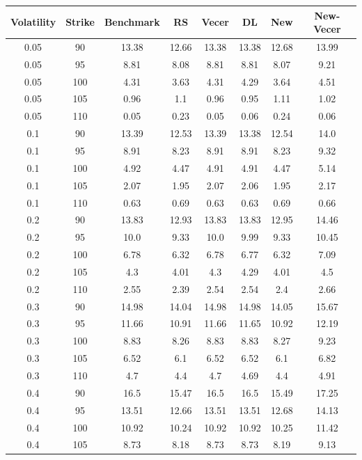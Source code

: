 \documentclass{article}
\begin{document}
\scriptsize
\begin{table}[H]
  \begin{tabular}{|c|c|c|c|c|c|c|c|}
  \hline
  Volatility & Strike & Benchmark & RS & Vecer & DL & New & New-Vecer \\
  \hline
  0.05 & 90 & 13.38 & 12.66 & 13.38 & 13.38 & 12.68 & 13.99 \\
  0.05 & 95 & 8.81 & 8.08 & 8.81 & 8.81 & 8.07 & 9.21 \\
  0.05 & 100 & 4.31 & 3.63 & 4.31 & 4.29 & 3.64 & 4.51 \\
  0.05 & 105 & 0.96 & 1.1 & 0.96 & 0.95 & 1.11 & 1.02 \\
  0.05 & 110 & 0.05 & 0.23 & 0.05 & 0.06 & 0.24 & 0.06 \\
  0.1 & 90 & 13.39 & 12.53 & 13.39 & 13.38 & 12.54 & 14.0 \\
  0.1 & 95 & 8.91 & 8.23 & 8.91 & 8.91 & 8.23 & 9.32 \\
  0.1 & 100 & 4.92 & 4.47 & 4.91 & 4.91 & 4.47 & 5.14 \\
  0.1 & 105 & 2.07 & 1.95 & 2.07 & 2.06 & 1.95 & 2.17 \\
  0.1 & 110 & 0.63 & 0.69 & 0.63 & 0.63 & 0.69 & 0.66 \\
  0.2 & 90 & 13.83 & 12.93 & 13.83 & 13.83 & 12.95 & 14.46 \\
  0.2 & 95 & 10.0 & 9.33 & 10.0 & 9.99 & 9.33 & 10.45 \\
  0.2 & 100 & 6.78 & 6.32 & 6.78 & 6.77 & 6.32 & 7.09 \\
  0.2 & 105 & 4.3 & 4.01 & 4.3 & 4.29 & 4.01 & 4.5 \\
  0.2 & 110 & 2.55 & 2.39 & 2.54 & 2.54 & 2.4 & 2.66 \\
  0.3 & 90 & 14.98 & 14.04 & 14.98 & 14.98 & 14.05 & 15.67 \\
  0.3 & 95 & 11.66 & 10.91 & 11.66 & 11.65 & 10.92 & 12.19 \\
  0.3 & 100 & 8.83 & 8.26 & 8.83 & 8.83 & 8.27 & 9.23 \\
  0.3 & 105 & 6.52 & 6.1 & 6.52 & 6.52 & 6.1 & 6.82 \\
  0.3 & 110 & 4.7 & 4.4 & 4.7 & 4.69 & 4.4 & 4.91 \\
  0.4 & 90 & 16.5 & 15.47 & 16.5 & 16.5 & 15.49 & 17.25 \\
  0.4 & 95 & 13.51 & 12.66 & 13.51 & 13.51 & 12.68 & 14.13 \\
  0.4 & 100 & 10.92 & 10.24 & 10.92 & 10.92 & 10.25 & 11.42 \\
  0.4 & 105 & 8.73 & 8.18 & 8.73 & 8.73 & 8.19 & 9.13 \\

\end{tabular}
\end{table}
\end{document}
